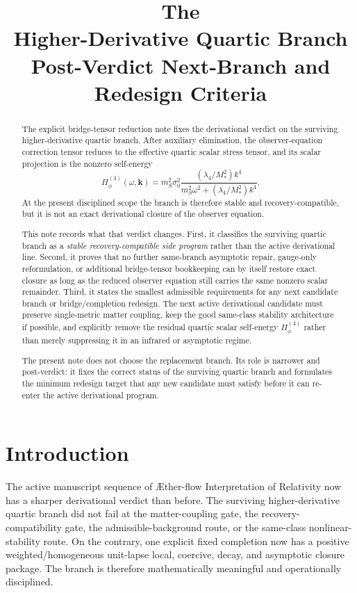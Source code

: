 \documentclass[11pt]{article}
\title{\textbf{The \TheoryName{}}\\[0.4em]
\large Higher-Derivative Quartic Branch Post-Verdict Next-Branch and Redesign Criteria}
\author{}
\date{}
\newcommand{\Aflow}{\AE{}ther-flow}
\newcommand{\TheoryName}{\Aflow{} Interpretation of Relativity}
\begin{document}
\maketitle

\begin{abstract}
The explicit bridge-tensor reduction note fixes the derivational verdict on the surviving higher-derivative quartic branch. After auxiliary elimination, the observer-equation correction tensor reduces to the effective quartic scalar stress tensor, and its scalar projection is the nonzero self-energy
\[
\Pi_\phi^{(4)}(\omega,\mathbf{k})
=
m_S^2\sigma_0^2
\frac{(\lambda_4/M_*^2)k^4}
{m_S^2\omega^2+(\lambda_4/M_*^2)k^4}.
\]
At the present disciplined scope the branch is therefore stable and recovery-compatible, but it is not an exact derivational closure of the observer equation.

This note records what that verdict changes. First, it classifies the surviving quartic branch as a \emph{stable recovery-compatible side program} rather than the active derivational line. Second, it proves that no further same-branch asymptotic repair, gauge-only reformulation, or additional bridge-tensor bookkeeping can by itself restore exact closure as long as the reduced observer equation still carries the same nonzero scalar remainder. Third, it states the smallest admissible requirements for any next candidate branch or bridge/completion redesign. The next active derivational candidate must preserve single-metric matter coupling, keep the good same-class stability architecture if possible, and explicitly remove the residual quartic scalar self-energy \(\Pi_\phi^{(4)}\) rather than merely suppressing it in an infrared or asymptotic regime.

The present note does not choose the replacement branch. Its role is narrower and post-verdict: it fixes the correct status of the surviving quartic branch and formulates the minimum redesign target that any new candidate must satisfy before it can re-enter the active derivational program.
\end{abstract}

\section{Introduction}

The active manuscript sequence of \TheoryName{} now has a sharper derivational verdict than before. The surviving higher-derivative quartic branch did not fail at the matter-coupling gate, the recovery-compatibility gate, the admissible-background route, or the same-class nonlinear-stability route. On the contrary, one explicit fixed completion now has a positive weighted/homogeneous unit-lapse local, coercive, decay, and asymptotic closure package. The branch is therefore mathematically meaningful and operationally disciplined.
\end{document}
